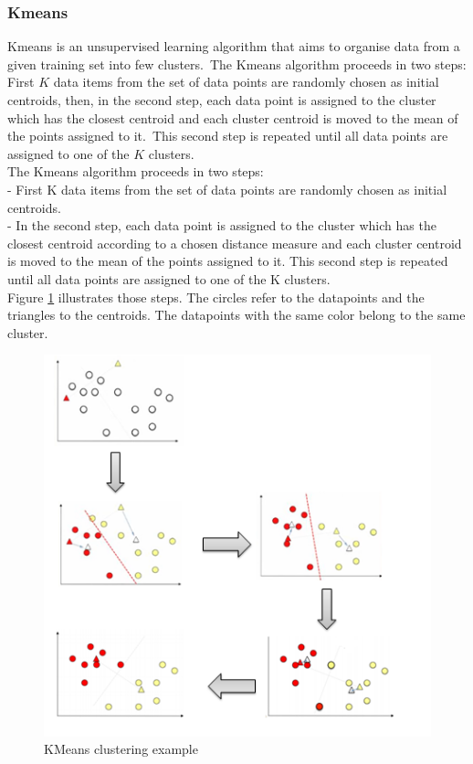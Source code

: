 \subsubsection{Kmeans} \label{kmeans}
Kmeans is an unsupervised learning algorithm that aims to organise data from a given training set into few clusters.\ The Kmeans algorithm proceeds in two steps: First $K$ data items from the set of data points are randomly chosen as initial centroids, then, in the second step, each data point is assigned to the cluster which has the closest centroid and each cluster centroid is moved to the mean of the points assigned to it.\ This second step is repeated until all data points are assigned to one of the $K$ clusters.\\

			The Kmeans algorithm proceeds in two steps: \\
			- First K data items from the set of data points are randomly chosen as initial centroids. \\
			- In the second step, each data point is assigned to the cluster which has the closest centroid according to a chosen distance measure and each cluster centroid is moved to the mean of the points assigned to it. This second step is repeated until all data points are assigned to one of the K clusters. \\ Figure \ref{expl1} illustrates those steps. The circles refer to the datapoints and the triangles to the centroids. The datapoints with the same color belong to the same cluster.
				\begin{figure}[h!]
					\centering
					\includegraphics[scale=0.7]{graphics/expKmeans.PNG} 
					\caption{KMeans clustering example\cite{a:kmeansExple}} \label{expl1} 
				\end{figure}

